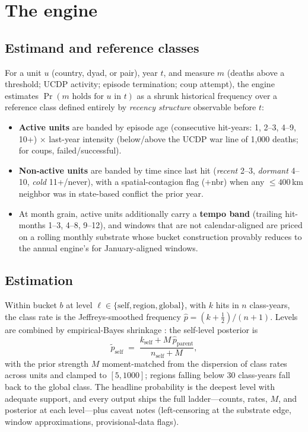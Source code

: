 \documentclass[11pt]{article}
\begin{document}
\section{The engine}\label{sec:engine}

\subsection{Estimand and reference classes}

For a unit $u$ (country, dyad, or pair), year $t$, and measure $m$ (deaths
above a threshold; UCDP activity; episode termination; coup attempt), the
engine estimates $\Pr(m \text{ holds for } u \text{ in } t)$ as a shrunk
historical frequency over a reference class defined entirely by
\emph{recency structure} observable before $t$:

\begin{itemize}
\item \textbf{Active units} are banded by episode age (consecutive
hit-years: 1, 2--3, 4--9, 10+) $\times$ last-year intensity (below/above the
UCDP war line of 1{,}000 deaths; for coups, failed/successful).
\item \textbf{Non-active units} are banded by time since last hit
(\emph{recent} 2--3, \emph{dormant} 4--10, \emph{cold} 11+/never), with a
spatial-contagion flag ($+$nbr) when any ${\leq}400$\,km neighbor was in
state-based conflict the prior year.
\item At month grain, active units additionally carry a \textbf{tempo band}
(trailing hit-months 1--3, 4--8, 9--12), and windows that are not
calendar-aligned are priced on a rolling monthly substrate whose bucket
construction provably reduces to the annual engine's for January-aligned
windows.
\end{itemize}

\subsection{Estimation}

Within bucket $b$ at level $\ell \in \{\text{self}, \text{region},
\text{global}\}$, with $k$ hits in $n$ class-years, the class rate is the
Jeffreys-smoothed frequency $\hat p = (k + \tfrac12)/(n + 1)$. Levels are
combined by empirical-Bayes shrinkage \citep{efron1975data}: the self-level
posterior is
\begin{equation}
\tilde p_{\text{self}} \;=\;
\frac{k_{\text{self}} + M\,\hat p_{\text{parent}}}{n_{\text{self}} + M},
\end{equation}
with the prior strength $M$ moment-matched from the dispersion of class
rates across units and clamped to $[5, 1000]$; regions falling below 30
class-years fall back to the global class. The headline probability is the
deepest level with adequate support, and every output ships the full
ladder---counts, rates, $M$, and posterior at each level---plus caveat notes
(left-censoring at the substrate edge, window approximations,
provisional-data flags).
\end{document}

